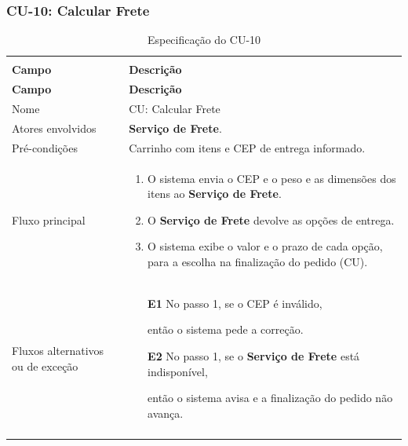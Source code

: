 \documentclass[12pt,a4paper]{article}
\begin{document}
\Needspace{200pt}
\subsubsection{CU-10: Calcular Frete}

{\setlength{\arrayrulewidth}{0.3pt}\renewcommand{\arraystretch}{1.1}\small{}
\begin{xltabular}{\textwidth}{>{\raggedright\arraybackslash}p{3.4cm}|>{\raggedright\arraybackslash}X}
\caption{Especificação do CU-10}\\
\toprule{}
\textbf{Campo} & \textbf{Descrição}\\ \midrule{}
\endfirsthead
{}\toprule{}
\textbf{Campo} & \textbf{Descrição}\\ \midrule{}
\endhead
\endlastfoot
Nome & CU: Calcular Frete\\ \hline
Atores envolvidos & \textbf{Serviço de Frete}.\\ \hline
Pré-condições & Carrinho com itens e CEP de entrega informado.\\ \hline
Fluxo principal & \begin{enumerate}[nosep,leftmargin=1.4em,label=\arabic*.,before=\vspace{-\baselineskip},after=\vspace{-0.4\baselineskip}]\item O sistema envia o CEP e o peso e as dimensões dos itens ao \textbf{Serviço de Frete}. \item O \textbf{Serviço de Frete} devolve as opções de entrega. \item O sistema exibe o valor e o prazo de cada opção, para a escolha na finalização do pedido (CU). \end{enumerate}\\ \hline
Fluxos alternativos ou de exceção & \begin{itemize}[nosep,leftmargin=2.2em,labelwidth=2.2em,labelsep=0pt,align=left,itemsep=4pt,before=\vspace{-\baselineskip},after=\vspace{-0.4\baselineskip}]\item[\textbf{E1}] No passo 1, se o CEP é inválido,\par então o sistema pede a correção. \item[\textbf{E2}] No passo 1, se o \textbf{Serviço de Frete} está indisponível,\par então o sistema avisa e a finalização do pedido não avança.\end{itemize}\\ \bottomrule
\end{xltabular}}
\end{document}
